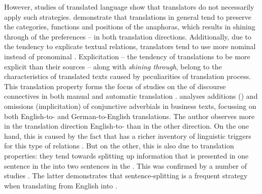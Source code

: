 \documentclass[output=paper]{langsci/langscibook.cls}
\begin{document}
However, studies of translated language show that translators do not necessarily apply such strategies.  \citet{ZinsmeisterEtAl2012} demonstrate that translations in general tend to preserve the categories, functions and positions of the  anaphoras, which results in {\sc shining through} of the  preferences \citep{Teich2003} -- in both translation directions. Additionally, due to the tendency to explicate textual relations, translators tend to use more nominal  instead of pronominal . {\sc Explicitation} -- the tendency of translations to be more explicit than their sources \citep{VinayDarbelnet58,BlumKulka1986} -- along with  \textsl{shining through}, belong to the characteristics of translated texts caused by peculiarities of translation process. This translation property forms the focus of studies on the  of discourse connectives in both manual and automatic translation \citep[see][]{Becher2011,Bisiada2014,MeyerWebber2013,LiEtAl2014COLING}. %
\citet{Becher2011} analyses additions () and omissions ({\sc implicitation}) of conjunctive adverbials in business texts, focussing on both English-to- and German-to-English translations. The author observes more  in the translation direction English-to- than in the other direction. On the one hand, this is caused by the fact that  has a richer inventory of linguistic triggers for this type of relations \citep[see][]{Becher2011,KunzLapshinova2014}. But on the other, this is also due to translation properties: they tend towards splitting up information that is presented in one sentence in the
 into two sentences in the . This was confirmed by a number of studies \citep[such as][]{fabricius1999information,Doherty2004,Bisiada2014}. The latter demonstrates that sentence-splitting is a frequent strategy when translating from English into . 
\end{document}
